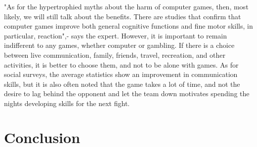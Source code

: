 \documentclass[10pt,twoside,slovak,a4paper]{article}
\begin{document}
"As for the hypertrophied myths about the harm of computer games, then, most likely, we will still talk about the benefits. There are studies that confirm that computer games improve both general cognitive functions and fine motor skills, in particular, reaction",- says the expert.
However, it is important to remain indifferent to any games, whether computer or gambling. If there is a choice between live communication, family, friends, travel, recreation, and other activities, it is better to choose them, and not to be alone with games.
As for social surveys, the average statistics show an improvement in communication skills, but it is also often noted that the game takes a lot of time, and not the desire to lag behind the opponent and let the team down motivates spending the nights developing skills for the next fight.



\section{Conclusion} \label{conclusion} 
\end{document}
